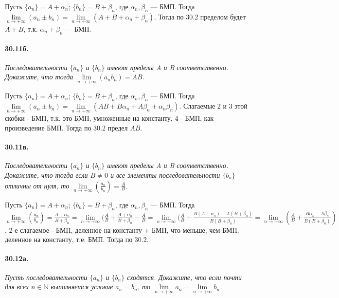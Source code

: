 \documentclass{book}
\begin{document}
Пусть $\{a_n\} = A + \alpha_n$; $\{b_n\} = B + \beta_n$, где $\alpha_n, \beta_n$ --- БМП. Тогда $\underset{n \to +\infty}{\lim} (a_n \pm b_n) = \underset{n \to +\infty}{\lim} (A + B + \alpha_n + \beta_n)$. Тогда по 30.2 пределом будет $A + B$, т.к. $\alpha_n + \beta_n$ --- БМП.

\paragraph{30.11б.}
\textit{Последовательности $\{a_n\}$ и $\{b_n\}$ имеют пределы A и B соответственно. Докажите, что тогда  $\underset{n \to +\infty}{\lim} (a_n b_n) = AB$.}

Пусть $\{a_n\} = A + \alpha_n$; $\{b_n\} = B + \beta_n$, где $\alpha_n, \beta_n$ --- БМП. Тогда $\underset{n \to +\infty}{\lim} (a_n \pm b_n) = \underset{n \to +\infty}{\lim} (AB + B\alpha_n + A\beta_n + \alpha_n\beta_n)$. Слагаемые 2 и 3 этой скобки - БМП, т.к. это БМП, умноженные на константу, 4 - БМП, как произведение БМП. Тогда по 30.2 предел $AB$.


\paragraph{30.11в.}
\textit{Последовательности $\{a_n\}$ и $\{b_n\}$ имеют пределы A и B соответственно. Докажите, что тогда если $B \neq 0$ и все элементы последовательности $\{b_n\}$ отличны от нуля, то $\underset{n \to +\infty}{\lim} (\tfrac{a_n}{ b_n}) = \tfrac{A}{B}$.}

Пусть $\{a_n\} = A + \alpha_n$; $\{b_n\} = B + \beta_n$, где $\alpha_n, \beta_n$ --- БМП. Тогда $\underset{n \to +\infty}{\lim} (\tfrac{a_n}{ b_n}) = \tfrac{A + \alpha_n}{B + \beta_n}= \underset{n \to +\infty}{\lim} (\tfrac{A}{B} + \tfrac{A + \alpha_n}{B + \beta_n} - \tfrac{A}{B} = \underset{n \to +\infty}{\lim} (\tfrac{A}{B} + \tfrac{B(A + \alpha_n) - A(B + \beta_n)}{B(B + \beta_n)}= \underset{n \to +\infty}{\lim} (\tfrac{A}{B} + \tfrac{B\alpha_n - A\beta_n}{B(B + \beta_n)})$. 2-е слагаемое - БМП, деленное на константу + БМП, что меньше, чем БМП, деленное на константу, т.е. БМП. Тогда по 30.2.

\paragraph{30.12а.}
\textit{Пусть последовательности  $\{a_n\}$ и $\{b_n\}$ сходятся. Докажите, что если почти для всех $n \in \mathbb{N}$ выполняется условие $a_n = b_n$, то $\underset{n \to +\infty}{\lim} a_n =\underset{n \to +\infty}{\lim} b_n$.}
\end{document}
